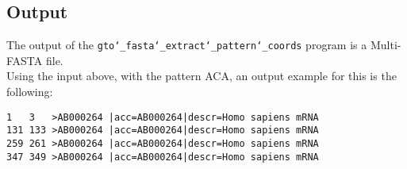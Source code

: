\subsection*{Output}
The output of the \texttt{gto\char`_fasta\char`_extract\char`_pattern\char`_coords} program is a Multi-FASTA  file.\\
Using the input above, with the pattern ACA, an output example for this is the following:
\begin{lstlisting}
1	3	>AB000264 |acc=AB000264|descr=Homo sapiens mRNA 
131	133	>AB000264 |acc=AB000264|descr=Homo sapiens mRNA 
259	261	>AB000264 |acc=AB000264|descr=Homo sapiens mRNA 
347	349	>AB000264 |acc=AB000264|descr=Homo sapiens mRNA  
\end{lstlisting}
